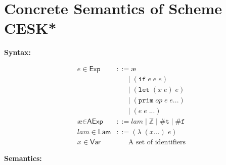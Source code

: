 \documentclass[12pt,draft]{article}
\begin{document}
\newcommand\mdoubleplus{\ensuremath{\mathbin{+\mkern-9mu+}}}
\newcommand\mae{\ensuremath{\text{\ae}}}
\newcommand{\lamsyn}[2]{(\lambda\;(#1 ...)\;#2)}
\newcommand{\letsyn}[3]{(\texttt{let}\;(#1\;#2)\;#3)}
\newcommand{\ifsyn}[3]{(\texttt{if}\;#1\;#2\;#3)}
\newcommand{\primsyn}[3]{(\texttt{prim}\;#1\;#2\;#3 ...)}
\newcommand{\truesyn}{\texttt{\#t}}
\newcommand{\falsesyn}{\texttt{\#f}}


\section{Concrete Semantics of Scheme CESK*}


\begin{center}
\textbf{Syntax:}
\end{center}
\vspace{-7mm}
\begin{align*}
e \in \textsf{Exp} &::= \mae \\
				  &	\;\;\;\;\; \;|\; \ifsyn{e}{e}{e}  \\
				  &	\;\;\;\;\; \;|\; \letsyn{x}{e}{e} \\
				  &	\;\;\;\;\; \;|\; \primsyn{op}{e}{e} \\
				  &	\;\;\;\;\; \;|\; (e \; e \; ...) \\
\mae \in \textsf{AExp} &::= lam \;|\; \mathbb{Z} \;|\; \truesyn \;|\; \falsesyn \\
lam \in \textsf{Lam} &::= \lamsyn{x}{e} \\
x \in \textsf{Var} &\;\;\;\;\;\; \text{A set of identifiers}
\end{align*}
\vspace{-10mm}
\begin{center}
\textbf{Semantics:}
\end{center}
\vspace{-7mm}
\end{document}

